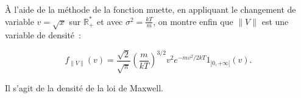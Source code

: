 À l'aide de la méthode de la fonction muette, en appliquant le
changement de variable \(v = \sqrt{x}\) sur \(\mathbb{R}_+^\ast\) et
avec \(\sigma^2 = \frac{kT}{m}\), on montre enfin que \(\|V\|\) est une
variable de densité~:

\[f_{\|V\|}(v) = \frac{\sqrt{2}}{\sqrt{\pi}}\left(\frac{m}{kT}\right)^{3/2}v^2 e^{- mv^2/2kT} 1_{]0,+\infty[}(v).\]

Il s'agit de la densité de la loi de Maxwell.
